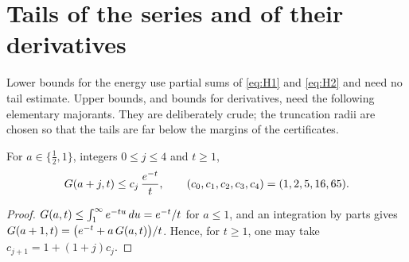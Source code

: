 \section{Tails of the series and of their derivatives}\label{app:tails}

Lower bounds for the energy use partial sums of \eqref{eq:H1} and \eqref{eq:H2} and need no tail estimate. Upper bounds, and bounds
for derivatives, need the following elementary majorants. They are deliberately crude; the truncation radii are chosen so that the
tails are far below the margins of the certificates.

\begin{lemma}\label{lem:Gbounds}
For $a\in\{\frac12,1\}$, integers $0\le j\le4$ and $t\ge1$,
\[
  G(a+j,t)\le c_j\,\frac{e^{-t}}t,\qquad (c_0,c_1,c_2,c_3,c_4)=(1,2,5,16,65).
\]
\end{lemma}

\begin{proof}
$G(a,t)\le\int_1^\infty e^{-tu}\,du=e^{-t}/t$ for $a\le1$, and an integration by parts gives
$G(a+1,t)=\bigl(e^{-t}+a\,G(a,t)\bigr)/t$. Hence, for $t\ge1$, one may take $c_{j+1}=1+(1+j)c_j$.
\end{proof}

